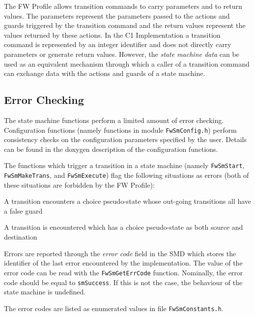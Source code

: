 \documentclass[manual]{../fwprofile}
\begin{document}
 

The FW Profile allows transition commands to carry parameters and to return values. The parameters represent 
the parameters passed to the actions and guards triggered by the transition command and the return values represent the 
values returned by these actions. In the C1 Implementation a transition command is represented by an integer 
identifier and does not directly carry parameters or generate return values. However, the \emph{state machine data} 
can be used as an equivalent mechanism through which a caller of a transition command can exchange data with the 
actions and guards of a state machine.

\subsection{Error Checking}\label{sec:smErrorChecking}
The state machine functions perform a limited amount of error checking. Configuration functions (namely functions 
in module \texttt{FwSmConfig.h}) perform consistency checks on the configuration parameters specified by the user. 
Details can be found in the doxygen description of the configuration functions. 

The functions which trigger a transition in a state machine (namely \texttt{FwSmStart}, \texttt{FwSmMakeTrans}, 
and \texttt{FwSmExecute}) flag the following situations as errors (both of these situations are forbidden by the 
FW Profile):

\begin{fw_itemize}
\item A transition encounters a choice pseudo-state whose out-going transitions all have a false guard
\item A transition is encountered which has a choice pseudo-state as both source and destination
\end{fw_itemize}

Errors are reported through the \emph{error code} field in the SMD which stores the identifier of the last 
error encountered by the implementation. The value of the error code can be read with the \texttt{FwSmGetErrCode} 
function. Nominally, the error code should be equal to \texttt{smSuccess}. If this is not the case, the behaviour 
of the state machine is undefined.

The error codes are listed as enumerated values in file \texttt{FwSmConstants.h}.
\end{document}
